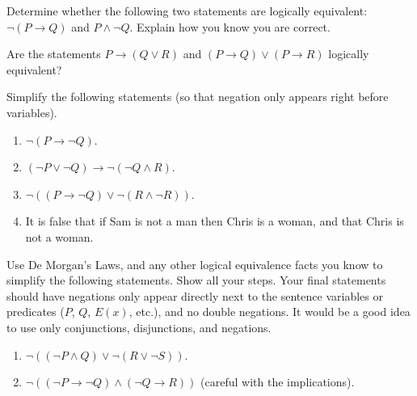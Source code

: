 \documentclass[10pt,]{book}
\theoremstyle{plain}
\theoremstyle{definition}
\theoremstyle{definition}
\theoremstyle{definition}
\theoremstyle{definition}
\numberwithin{equation}{chapter}
\def\imp{\rightarrow}
\begin{document}
\begin{divisionexercise}{5}\hypertarget{exercise-224}{}
\hypertarget{p-1980}{}%
Determine whether the following two statements are logically equivalent:  \(\neg(P \imp Q)\) and \(P \wedge \neg Q\). Explain how you know you are correct.%
\end{divisionexercise}%
\begin{divisionexercise}{6}\hypertarget{exercise-225}{}
\hypertarget{p-1982}{}%
Are the statements \(P \imp (Q\vee R)\) and \((P \imp Q) \vee (P \imp R)\) logically equivalent?%
\end{divisionexercise}%
\begin{divisionexercise}{7}\hypertarget{exercise-226}{}
\hypertarget{p-1983}{}%
Simplify the following statements (so that negation only appears right before variables).%
\par
\hypertarget{p-1984}{}%
\leavevmode%
\begin{enumerate}[label=(\alph*)]
\item\hypertarget{li-651}{}\(\neg(P \imp \neg Q)\).%
\item\hypertarget{li-652}{}\((\neg P \vee \neg Q) \imp \neg (\neg Q \wedge R)\).%
\item\hypertarget{li-653}{}\(\neg((P \imp \neg Q) \vee \neg (R \wedge \neg R))\).%
\item\hypertarget{li-654}{}\hypertarget{p-1985}{}%
It is false that if Sam is not a man then Chris is a woman, and that Chris is not a woman.%
\end{enumerate}
%
\end{divisionexercise}%
\begin{divisionexercise}{8}\hypertarget{exercise-227}{}
\hypertarget{p-1989}{}%
Use De Morgan's Laws, and any other logical equivalence facts you know to simplify the following statements. Show all your steps. Your final statements should have negations only appear directly next to the sentence variables or predicates (\(P\), \(Q\), \(E(x)\), etc.), and no double negations. It would be a good idea to use only conjunctions, disjunctions, and negations.%
\par
\hypertarget{p-1990}{}%
\leavevmode%
\begin{enumerate}[label=(\alph*)]
\item\hypertarget{li-659}{}\(\neg((\neg P \wedge Q) \vee \neg(R \vee \neg S))\). %
\item\hypertarget{li-660}{}\(\neg((\neg P \imp \neg Q) \wedge (\neg Q \imp R))\) (careful with the implications). %
\end{enumerate}
%
\end{divisionexercise}%
\end{document}
